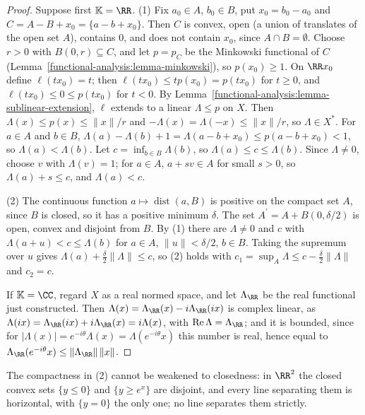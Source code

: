 \begin{proof}
Suppose first $\mathbb{K} = \RR$. (1) Fix $a_0 \in A$, $b_0 \in B$, put $x_0 = b_0 - a_0$ and $C = A - B + x_0 = \{a - b + x_0\}$. Then $C$ is convex, open (a union of translates of the open set $A$), contains
$0$, and does not contain $x_0$, since $A \cap B = \emptyset$. Choose $r > 0$ with $B(0, r) \subseteq C$, and let $p = p_C$ be the Minkowski functional of $C$
(Lemma~\ref{functional-analysis:lemma-minkowski}), so $p(x_0) \geq 1$. On $\RR x_0$ define $\ell(tx_0) = t$; then
$\ell(tx_0) \leq tp(x_0) = p(tx_0)$ for $t \geq 0$, and $\ell(tx_0) \leq 0 \leq p(tx_0)$ for $t < 0$. By Lemma~\ref{functional-analysis:lemma-sublinear-extension}, $\ell$ extends to a linear $\Lambda \leq p$ on $X$. Then
$\Lambda(x) \leq p(x) \leq \|x\|/r$ and $-\Lambda(x) = \Lambda(-x) \leq \|x\|/r$, so $\Lambda \in X^*$. For $a \in A$ and $b \in B$, $\Lambda(a) - \Lambda(b) + 1 = \Lambda(a - b + x_0) \leq p(a - b + x_0) < 1$, so
$\Lambda(a) < \Lambda(b)$. Let $c = \inf_{b \in B}\Lambda(b)$, so $\Lambda(a) \leq c \leq \Lambda(b)$. Since $\Lambda \neq 0$, choose $v$ with $\Lambda(v) = 1$; for $a \in A$, $a + sv \in A$ for small $s > 0$, so
$\Lambda(a) + s \leq c$, and $\Lambda(a) < c$.

(2) The continuous function $a \mapsto \operatorname{dist}(a, B)$ is positive on the compact set $A$, since $B$ is closed, so it has a positive minimum $\delta$. The set $A^{\prime} = A + B(0, \delta/2)$ is open, convex and disjoint
from $B$. By (1) there are $\Lambda \neq 0$ and $c$ with $\Lambda(a + u) < c \leq \Lambda(b)$ for $a \in A$, $\|u\| < \delta/2$, $b \in B$. Taking the supremum over $u$ gives $\Lambda(a) + \frac{\delta}{2}\|\Lambda\| \leq c$,
so (2) holds with $c_1 = \sup_A\Lambda \leq c - \frac\delta2\|\Lambda\|$ and $c_2 = c$.

If $\mathbb{K} = \CC$, regard $X$ as a real normed space, and let $\Lambda_\RR$ be the real functional just constructed. Then $\Lambda(x) = \Lambda_\RR(x) - i\Lambda_\RR(ix)$ is complex linear, as
$\Lambda(ix) = \Lambda_\RR(ix) + i\Lambda_\RR(x) = i\Lambda(x)$, with $\operatorname{Re}\Lambda = \Lambda_\RR$; and it is bounded, since for $|\Lambda(x)| = e^{-i\theta}\Lambda(x) = \Lambda(e^{-i\theta}x)$ this number is real, hence equal to
$\Lambda_\RR(e^{-i\theta}x) \leq \|\Lambda_\RR\|\,\|x\|$.
\end{proof}

The compactness in (2) cannot be weakened to closedness: in $\RR^2$ the closed convex sets $\{y \leq 0\}$ and $\{y \geq e^x\}$ are disjoint, and every line separating them is horizontal, with $\{y = 0\}$
the only one; no line separates them strictly.

